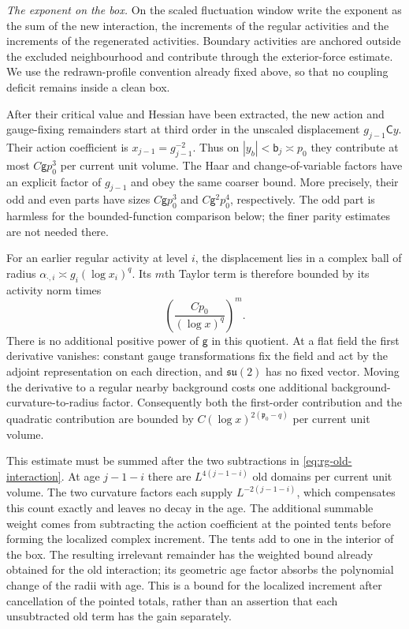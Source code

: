 \documentclass[11pt,letterpaper,reqno]{amsart}
\theoremstyle{definition}
\theoremstyle{remark}
\begin{document}
\emph{The exponent on the box.}
On the scaled fluctuation window write the exponent as the sum of
the new interaction, the increments of the regular activities and
the increments of the regenerated activities. Boundary activities
are anchored outside the excluded neighbourhood and contribute
through the exterior-force estimate. We use the redrawn-profile
convention already fixed above, so that no coupling deficit remains
inside a clean box.

After their critical value and Hessian have been extracted, the new
action and gauge-fixing remainders start at third order
in the unscaled displacement $g_{j-1}\mathsf Cy$. Their action
coefficient is $x_{j-1}=g_{j-1}^{-2}$. Thus on
$|y_b|<\mathsf b_j\asymp p_0$ they contribute at most
$C\mathsf g p_0^3$ per current unit volume. The Haar and
change-of-variable factors have an explicit factor of
$g_{j-1}$ and obey the same coarser bound. More precisely, their
odd and even parts have sizes
$C\mathsf g p_0^3$ and $C\mathsf g^2p_0^4$, respectively.
The odd part is harmless for the bounded-function comparison
below; the finer parity estimates are not needed there.

For an earlier regular activity at level $i$, the displacement
lies in a complex ball of radius
$\alpha_{\cdot,i}\asymp g_i(\log x_i)^q$. Its $m$th Taylor
term is therefore bounded by its activity norm times
\[
 \left(\frac{Cp_0}{(\log x)^q}\right)^m.
\]
There is no additional positive power of $\mathsf g$ in this
quotient. At a flat field the first derivative vanishes: constant
gauge transformations fix the field and act by the adjoint
representation on each direction, and $\mathfrak{su}(2)$ has no
fixed vector. Moving the derivative to a regular nearby background
costs one additional background-curvature-to-radius factor.
Consequently both the first-order contribution and the quadratic
contribution are bounded by
$C(\log x)^{2(\mathfrak p_0-q)}$ per current unit volume.

This estimate must be summed after the two subtractions in
\eqref{eq:rg-old-interaction}. At age $j-1-i$ there are
$L^{4(j-1-i)}$ old domains per current unit volume. The two
curvature factors each supply $L^{-2(j-1-i)}$, which compensates
this count exactly and leaves no decay in the age. The additional
summable weight comes from subtracting the action coefficient at
the pointed tents before forming the localized complex increment.
The tents add to one in the interior of the box. The resulting
irrelevant remainder has the weighted bound already obtained for
the old interaction; its geometric age factor absorbs the
polynomial change of the radii with age. This is a bound for the
localized increment after cancellation of the pointed totals,
rather than an assertion that each unsubtracted old term has the
gain separately.
\end{document}
